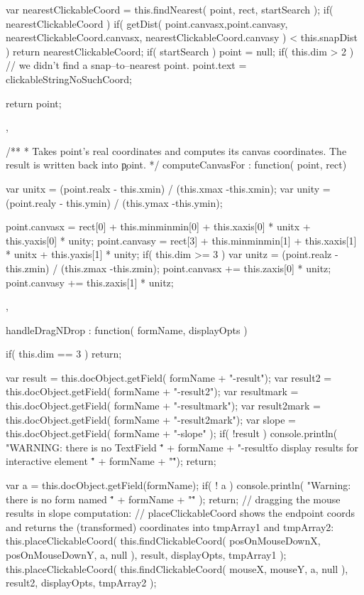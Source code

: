 {{		var nearestClickableCoord = this.findNearest( point, rect, startSearch );
		if( nearestClickableCoord ) {
			if( getDist( point.canvasx,point.canvasy,  nearestClickableCoord.canvasx, nearestClickableCoord.canvasy ) < this.snapDist ) {
				return nearestClickableCoord;
			}
		}
		if( startSearch )
			point = null;
		if( this.dim > 2 ) { // we didn't find a snap--to--nearest point.
			point.text = clickableStringNoSuchCoord;
		}

		return point;
	},

	/**
	 * Takes point's real coordinates and computes its canvas coordinates. The result is written back into \c point.
	 */
	computeCanvasFor : function( point, rect)
	{
		var unitx = (point.realx - this.xmin) / (this.xmax -this.xmin);
		var unity = (point.realy - this.ymin) / (this.ymax -this.ymin);

		point.canvasx = rect[0] + this.minminmin[0] + this.xaxis[0] * unitx + this.yaxis[0] * unity;
		point.canvasy = rect[3] + this.minminmin[1] + this.xaxis[1] * unitx + this.yaxis[1] * unity;
		if( this.dim >= 3 ) {
			var unitz = (point.realz - this.zmin) / (this.zmax -this.zmin);
			point.canvasx += this.zaxis[0] * unitz;
			point.canvasy += this.zaxis[1] * unitz;
		}
	},

	handleDragNDrop : function( formName, displayOpts )
	{
		if( this.dim == 3 )
			return;

		var result = this.docObject.getField( formName + "-result");
		var result2 = this.docObject.getField( formName + "-result2");
		var resultmark = this.docObject.getField( formName + "-resultmark");
		var result2mark = this.docObject.getField( formName + "-result2mark");
		var slope 	= this.docObject.getField( formName + "-slope" );
		if( !result ) {
			console.println( "WARNING: there is no TextField \"" + formName + "-result\" to display results for interactive element \"" + formName + "\"");
			return;
		}

		var a = this.docObject.getField(formName);
		if( ! a ) {
			console.println( "Warning: there is no form named \"" + formName + "\"" );
			return;
		}
		// dragging the mouse results in slope computation:
		// placeClickableCoord shows the endpoint coords and returns the (transformed) coordinates into tmpArray1 and tmpArray2:
		this.placeClickableCoord(
			this.findClickableCoord( posOnMouseDownX, posOnMouseDownY, a, null ),
			result, displayOpts, tmpArray1 );
		this.placeClickableCoord(
			this.findClickableCoord( mouseX, mouseY, a, null ),
			result2, displayOpts, tmpArray2 );

}}
